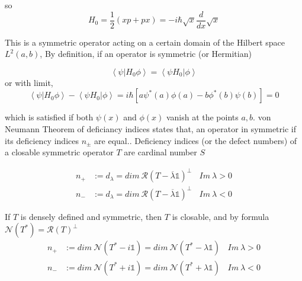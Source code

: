 \documentclass[12pt]{report}
\newcommand*{\1}{\hspace{1pt}}
\begin{document}
        so 
        \begin{equation}
            H_{0} = \frac{1}{2}\left(xp + px\right) = -i\hbar\sqrt{x}\frac{d}{dx}\sqrt{x}
        \end{equation}
        

        This is a symmetric operator acting on a certain domain of the Hilbert space $L^{2}(a,b)$, By definition, if an operator is symmetric (or Hermitian)\cite{s5}

        \begin{equation}
            \left\langle\psi | H_{0}\phi \right\rangle = \left\langle\psi H_{0} |\phi \right\rangle
        \end{equation}
         or with limit,
        \begin{equation}
            \left\langle\psi | H_{0}\phi \right\rangle - \left\langle\psi H_{0} |\phi \right\rangle = i \hbar \left[a\psi ^{*}(a)\phi(a) - b\phi ^{*}(b)\psi(b)\right] = 0
        \end{equation}
        
        which is satisfied if both $\psi (x)$ and $\phi (x)$ vanish at the points $a, b$. von Neumann Theorem of deficiancy indices states that, an operator in symmetric if its deficiency
        indices $n_{\pm }$ are equal.\cite{s6}. Deficiency indices (or the defect numbers) of a closable symmetric operator $T$ are cardinal number $S$

        \begin{equation}
            \begin{split}
                n_{+} &:= d_{\lambda}  = dim \ \mathcal{R} (T-\overline{\lambda}\mathds{1})^{\perp }  \ \ \ \    Im \ \lambda > 0 \\
                n_{-} &:= d_{\lambda}  = dim \ \mathcal{R} (T-\overline{\lambda}\mathds{1})^{\perp }  \ \ \ \    Im \ \lambda < 0 
            \end{split}
        \end{equation}

        If $T$ is densely defined and symmetric, then $T$ is closable, and by formula $\mathcal{N}(T^{*}) = \mathcal{R}(T)^{\perp}$
        \begin{equation}
            \begin{split}
                n_{+} &:= dim \ \mathcal{N} (T^{*}-i\mathds{1})  = dim \ \mathcal{N} (T^{*}-\lambda \mathds{1})  \ \ \ \    Im \ \lambda > 0 \\
                n_{-} &:= dim \ \mathcal{N} (T^{*}+i\mathds{1})  = dim \ \mathcal{N} (T^{*}+\lambda \mathds{1})  \ \ \ \    Im \ \lambda < 0 
            \end{split}
        \end{equation}
\end{document}
